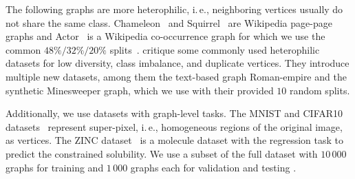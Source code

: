 \documentclass[conference]{IEEEtran}
\newcommand{\ie}{i.\,e.,\xspace}
\begin{document}
The following graphs are more heterophilic, \ie neighboring vertices usually do not share the same class. 
Chameleon~\citep{ChamSqui} and Squirrel~\citep{ChamSqui} are Wikipedia page-page graphs and
Actor~\citep{geomgcn} is a Wikipedia co-occurrence graph for which we use the common $48\%/ 32\%/ 20\%$ splits~\citep{geomgcn}.
\citet{heter} critique some commonly used heterophilic datasets for low diversity, class imbalance, and duplicate vertices.
They introduce multiple new datasets, among them the text-based graph Roman-empire and the synthetic Minesweeper graph, which we use with their provided $10$ random splits.

Additionally, we use datasets with graph-level tasks.
The MNIST and CIFAR10 datasets~\cite{DBLP:journals/jmlr/DwivediJL0BB23} represent super-pixel, \ie homogeneous regions of the original image, as vertices.
The ZINC dataset~\cite{DBLP:journals/jcisd/SterlingI15,DBLP:journals/corr/Gomez-Bombarelli16} is a molecule dataset with the regression task to predict the constrained solubility.
We use a subset of the full dataset with $10\,000$ graphs for training and $1\,000$ graphs each for validation and testing \cite{DBLP:journals/jmlr/DwivediJL0BB23}.
\end{document}
